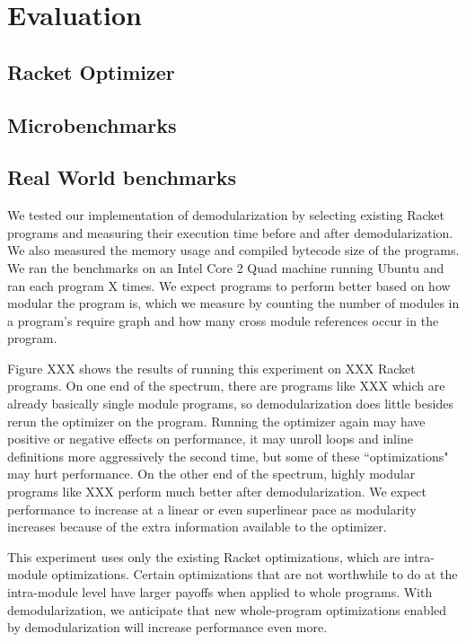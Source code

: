 \chapter{Evaluation}
\label{chap:evaluation}

\section{Racket Optimizer}
\section{Microbenchmarks}
\section{Real World benchmarks}

We tested our implementation of demodularization by selecting existing Racket programs and measuring their execution time before and after demodularization.
We also measured the memory usage and compiled bytecode size of the programs.
We ran the benchmarks on an Intel Core 2 Quad machine running Ubuntu and ran each program X times.
We expect programs to perform better based on how modular the program is, which we measure by counting the number of modules in a program's require graph and how many cross module references occur in the program.

Figure XXX shows the results of running this experiment on XXX Racket programs. 
On one end of the spectrum, there are programs like XXX which are already basically single module programs, so demodularization does little besides rerun the optimizer on the program. Running the optimizer again may have positive or negative effects on performance, it may unroll loops and inline definitions more aggressively the second time, but some of these ``optimizations" may hurt performance.
On the other end of the spectrum, highly modular programs like XXX perform much better after demodularization.
We expect performance to increase at a linear or even superlinear pace as modularity increases because of the extra information available to the optimizer.

This experiment uses only the existing Racket optimizations, which are intra-module optimizations.
Certain optimizations that are not worthwhile to do at the intra-module level have larger payoffs when applied to whole programs. 
With demodularization, we anticipate that new whole-program optimizations enabled by demodularization will increase performance even more.

